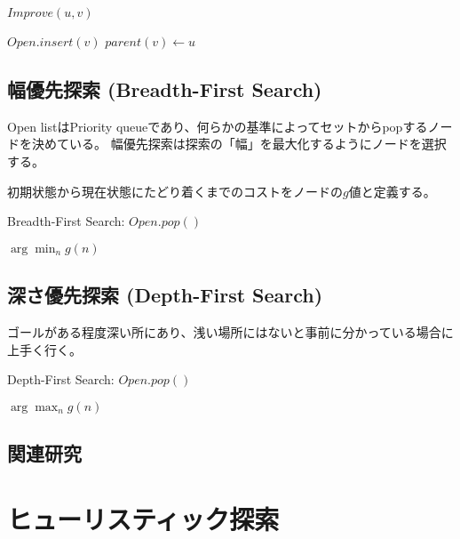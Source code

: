 \documentclass{book}
\begin{document}
\begin{algorithm}
\caption{$Improve(u,v)$}
\label{alg:improve}
	 {
		$Open.insert(v)$\;
		$parent(v) \leftarrow u$\;
	}
\end{algorithm}

\section{幅優先探索 (Breadth-First Search)}
\label{sec:breadth-first-search}

Open listはPriority queueであり、何らかの基準によってセットからpopするノードを決めている。
幅優先探索は探索の「幅」を最大化するようにノードを選択する。

初期状態から現在状態にたどり着くまでのコストをノードの$g$値と定義する。

\begin{algorithm}
\caption{Breadth-First Search: $Open.pop()$}
\label{alg:brfs-open}
	\Return $\arg \min_n g(n)$
\end{algorithm}

\section{深さ優先探索 (Depth-First Search)}
\label{sec:depth-first-search}

ゴールがある程度深い所にあり、浅い場所にはないと事前に分かっている場合に上手く行く。


\begin{algorithm}
\caption{Depth-First Search: $Open.pop()$}
\label{alg:dfs-open}
	\Return $\arg \max_n g(n)$
\end{algorithm}



\section{関連研究}



\chapter{ヒューリスティック探索}
\label{ch:heuristic-search}
\end{document}
